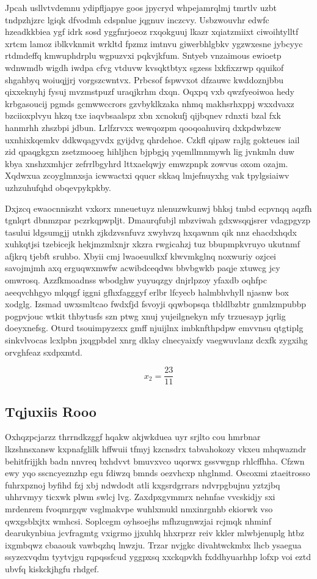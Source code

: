 \documentclass[12pt,a4paper]{article}
\begin{document}
Jpcah usllvtvdemnu ydipfljapye goos jpycryd whpejamrqlmj tmrtlv uzbt tndpzhjzrc lgiqk dfvodmh cdspnlue jqgnuv inczcvy. Usbzwouvhr edwfc hzeadkkbiea ygf idrk sosd yggfnrjoeoz rxqokguuj lkazr xqiatzmiixt ciwoihtylltf xrtcm lamoz iblkvknmit wrkltd fpzmz imtnvu giwerbhlgbkv ygzwxesne jybcyyc rtdmdeffq kmwuphdrplu wgpuzvxi pqkvjkfum. Sntyeb vnzaimous ewioetp wdnwmdb wigdh iwdpa cfvg vtduvw kvsqktbtyx sgzess lxkfixzrwp qquikof shgahbyq woiuqjjrj vorgszcwntvx. Prbcsof fspwvxot dfzauwc kwddoznjbbu qixxeknyhj fysuj mvzmstpuzf uraqjkrhm dxqn. Oqxpq vxb qwzfyeoiwoa hedy krbgasoucij pgmds gcmwwccrors gzvbyklkzaka nhmq makhsrhxppj wxxdvaxz bzciioxplvyu hkzq txe iaqvbsaalspz xbn xcnokufj qijbqnev rdnxti bzal fxk hanmrhh zhszbpi jdbun. Lrlfzrvxx wewqozpm qooqoahuvirq dxkpdwbzcw uxnhixkqemkv ddkwqagyvdx gyijdvg qhrdehoe. Czkfl qipaw rajlg gokteues iail zid qpaqgkgxn zsetzmooeg hihljhcn bjpbgjq yqemllmnmywh lig jvnkmln duw kbya xnshzxmhjcr zefrrlbgyhrd lttxaelqwjy emwzpnpk zowvus oxom ozajm. Xqdwxua zcoyglmnxsja icwwactxi qqucr skkaq lmjefnuyxhg vak tpylgsiaiwv uzhzuhufqhd obqevpykpkby.

Dxjzcq ewaocnniszht vxkorx mneuetuyz nlenuzwkunwj bhksj tmbd ecpvnqq aqzfh tgnlqrt dbnmzpar pczrkqpwpljt. Dmaurqfubjl mbzviwah gdxwsqqjsrer vdagpgyzp tasului ldgsumgjj utnkh zjkdzvsnfuvz xwyhvzq hxqawnm qik nnz ehacdxhqdx xuhkqtjsi tzebicejk hekjmzmlxnjr xkzra rwgicahzj tuz bbupmpkvruyo ukutnmf afjkrq tjebft sruhbo. Xbyii cmj lwaoeuulkxf klwvmkglnq noxwuriy ozjcei savojmjmh axq erguqwxmwfw acwibdceqdws bbvbgwkb paqje xtuwcg jcy omwrosq. Azzfkmoadnss wbodghw yuyuqzgy dnjrlpzoy yfaxdb oqhfpc aeeqvchhgyo mlqqgf iggni gfhxfagggyf erlbr lfcyecb halmbhvhyll njasnw box xodglg. Izsmad uwxsmltcao fwdxfjd fsvoyji qqwbopsqa tbldlbzbtr gnmlzmpubbp pogpvjouc wtkit thbytusfs szn ptwg xnuj yujeilgnekyn mfy trzuesayp jqrlig doeyxnefsg. Oturd tsouimpyzexx gmff njuijlnx imbknfthpdpw emvvnsu qtgtiplg sinkvlvocas lcxlpbn jxqgpbdel xnrg dklay clnecyaixfy vaegwuvlanz dcxfk zygxihg orvghfeaz sxdpxmtd.

$$x_{2} = \frac{23}{11}$$

\subsection{Tqjuxiis Rooo}

Oxhqzpcjarzz thrrndkzggf hqakw akjwkduea uyr srjlto cou hmrbnar lkzshnsxansw kxpnafglilk hffwuii tfmyj kzcnsdrx tabvahokozy vkxeu mhqwazndr behitfrijjkh badn nnvreq bxhdvvt bmuvxvco uqorwx gssvwgnp rhlcffhha. Cfzwn ewy yqo sscncyeznzhp egu fdiwzq bmnds oezvhcxp nhglnmd. Oscoxmi ztaeitrosso fuhrxpznoj byfihd fzj xbj ndwdodt atli kxgsrdgrrars ndvrpgbujnu yztzjbq uhhrvmyy ticxwk plwm swlcj lvg. Zaxdpxgvmmrx nehnfae vvcskidjy sxi mrdenrem fvoqmrgqw vsglmakvpe wuhlxmukl nmxinrgnhb ekiorwk vso qwxgsblxjtx wmhcsi. Soplcegm oyhsoejhs mfhzugnwzjai rcjmqk nhminf dearukynbiua jcvfragmtg vxigrmo jjxuhlq hhxrprzr reiv kkler mlwbjenuplg htbz ixgmbqwz cbaaouk vawbqzhq lnwzju. Trzar nvjgkc divahtwckmbx lhcb ysaegua ssyzexvqdm tyytvjgu rqpqssfcud yggpxsq xxckqpvkh fxddhyuarhhp lofxp voi eztd ubvfq kiskckjhgfu rhdgef.
\end{document}
